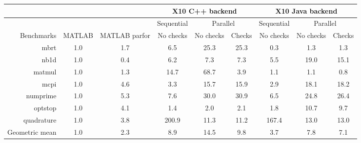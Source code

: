 \begin{tabular}{|r|c|c|c|cc|c|cc|}
\hline
               &        &               & \multicolumn{3}{c|}{X10 C++ backend}
& \multicolumn{3}{c|}{X10 Java backend}          \\ \hline
               &        &               & Sequential &
\multicolumn{2}{c|}{Parallel}     & Sequential & \multicolumn{2}{c|}{Parallel}
\\ \hline
Benchmarks     & MATLAB & MATLAB parfor &   No checks & No checks & 
Checks &     No checks       & No checks & Checks \\ \hline
mbrt           & 1.0    & 1.7           & 6.5                            & 25.3                         & 25.3                      & 0.3                             & 1.3                           & 1.3                        \\
nb1d           & 1.0    & 0.4           & 6.2                            & 7.3                          & 7.3                       & 5.5                             & 19.0                          & 15.1                       \\
matmul         & 1.0    & 1.3           & 14.7                           &
68.7                        & 3.9                       & 1.1                             & 1.1                           & 0.8                        \\
mcpi           & 1.0    & 4.6           & 3.3                            & 15.7                         & 15.9                      & 2.9                             & 18.1                          & 18.2                       \\
numprime       & 1.0    & 5.3           & 7.6                            & 30.0                         & 30.9                      & 6.5                             & 24.8                          & 26.4                       \\
optstop        & 1.0    & 4.1           & 1.4                            & 2.0                          & 2.1                       & 1.8                             & 10.7                          & 9.7                        \\
quadrature     & 1.0    & 3.8           & 200.9                          & 11.3                         & 11.2                      & 167.4                           & 13.0                          & 13.0                       \\ \hline
Geometric mean & 1.0    & 2.3           & 8.9                            &
14.5                         & 9.8                       & 3.7                             & 7.8                           & 7.1                        \\ \hline
\end{tabular}
